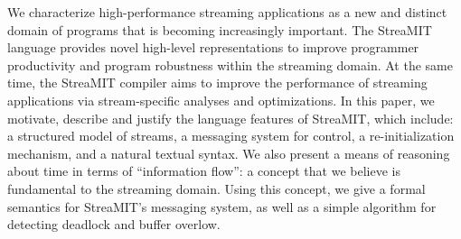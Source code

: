 We characterize high-performance streaming applications as a new and
distinct domain of programs that is becoming increasingly important.
The StreaMIT language provides novel high-level representations to
improve programmer productivity and program robustness within the
streaming domain.  At the same time, the StreaMIT compiler aims to
improve the performance of streaming applications via stream-specific
analyses and optimizations.  In this paper, we motivate, describe and
justify the language features of StreaMIT, which include: a structured
model of streams, a messaging system for control, a re-initialization
mechanism, and a natural textual syntax.  We also present a means of
reasoning about time in terms of ``information flow'': a concept that
we believe is fundamental to the streaming domain.  Using this
concept, we give a formal semantics for StreaMIT's messaging system,
as well as a simple algorithm for detecting deadlock and buffer
overlow.
